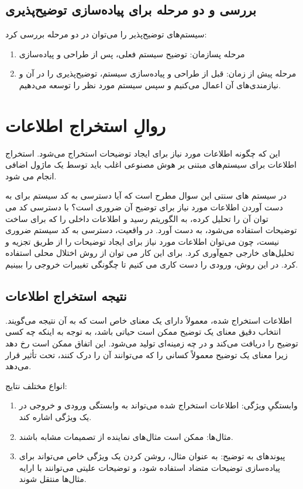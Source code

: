 \subsection{بررسی و دو مرحله برای پیاده‌سازی توضیح‌پذیری}

سیستم‌های توضیح‌پذیر را می‌توان در دو مرحله بررسی کرد:

\begin{enumerate}
    \item مرحله پسازمان: توضیح سیستم فعلی، پس از طراحی و پیاده‌سازی
    \item مرحله پیش از زمان: قبل از طراحی و پیاده‌سازی سیستم، توضیح‌پذیری را در
    آن و نیازمندی‌های آن اعمال می‌کنیم و سپس سیستم مورد نظر را توسعه می‌دهیم.
\end{enumerate}

\section{روالِ استخراج اطلاعات}

این که چگونه اطلاعات مورد نیاز برای ایجاد توضیحات استخراج می‌شود. استخراج
اطلاعات برای سیستم‌های مبتنی بر هوش مصنوعی اغلب باید توسط یک ماژول اضافی انجام
می شود.

در سیستم های سنتی این سوال مطرح است که آیا دسترسی به کد سیستم برای به دست آوردن
اطلاعات مورد نیاز برای توضیح آن ضروری است؟ با دسترسی کد می توان آن را تحلیل
کرده، به الگوریتم رسید و اطلاعات داخلی را که برای ساخت توضیحات استفاده می‌شود،
به دست آورد.  در واقعیت، دسترسی به کد سیستم ضروری نیست، چون می‌توان اطلاعات مورد
نیاز برای ایجاد توضیحات را از طریق تجزیه و تحلیل‌های خارجی جمع‌آوری کرد. برای
این کار می توان از روش اختلال محلی استفاده کرد. در این روش، ورودی را دست کاری می
کنیم تا چگونگی تغییرات خروجی را ببینیم.

\subsection{نتیجه استخراج اطلاعات}

اطلاعات استخراج شده، معمولاً دارای یک معنای خاص است که به آن نتیجه می‌گویند.
انتخاب دقیق معنای یک توضیح ممکن است حیاتی باشد، به توجه به اینکه چه کسی توضیح را
دریافت می‌کند و در چه زمینه‌ای تولید می‌شود. این اتفاق ممکن است رخ دهد زیرا
معنای یک توضیح معمولاً کسانی را که می‌توانند آن را درک کنند، تحت تأثیر قرار
می‌دهد.

انواع مختلف نتایج:

\begin{enumerate}
    \item وابستگیِ ویژگی: اطلاعات استخراج شده می‌تواند به وابستگی ورودی و خروجی
    در یک ویژگی اشاره کند. 
    \item مثال‌ها: ممکن است مثال‌های نماینده از تصمیمات مشابه باشند.
    \item پیوندهای به توضیح: به عنوان مثال، روشن کردن یک ویژگی خاص می‌تواند برای
    پیاده‌سازی توضیحات متضاد استفاده شود، و توضیحات علیتی می‌توانند با ارایه
    مثال‌ها منتقل شوند.
\end{enumerate}

